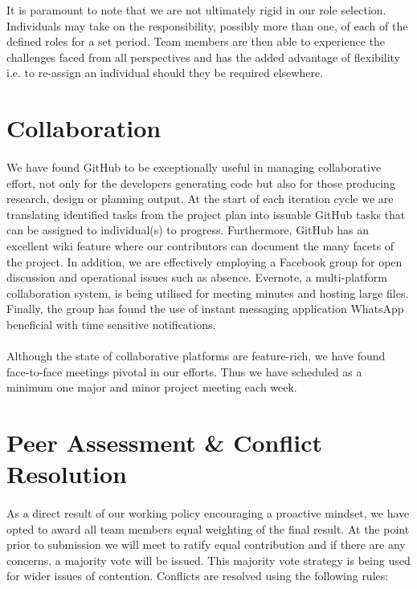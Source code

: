 \documentclass[11pt,a4paper]{article}
\begin{document}
It is paramount to note that we are not ultimately rigid in our role selection.  Individuals may take on the responsibility, possibly more than one, of each of the defined roles for a set period.  Team members are then able to experience the challenges faced from all perspectives and has the added advantage of flexibility i.e. to re-assign an individual should they be required elsewhere.

\section{Collaboration}
\paragraph{}
We have found GitHub to be exceptionally useful in managing collaborative effort, not only for the developers generating code but also for those producing research, design or planning output.  At the start of each iteration cycle we are translating identified tasks from the project plan into issuable GitHub tasks that can be assigned to individual(s) to progress.  Furthermore, GitHub has an excellent wiki feature where our contributors can document the many facets of the project.
\newline
In addition, we are effectively employing a Facebook group for open discussion and operational issues such as absence.  Evernote, a multi-platform collaboration system, is being utilised for meeting minutes and hosting large files.  Finally, the group has found the use of instant messaging application WhatsApp beneficial with time sensitive notifications.
\paragraph{}
Although the state of collaborative platforms are feature-rich, we have found face-to-face meetings pivotal in our efforts.  Thus we have scheduled as a minimum one major and minor project meeting each week.

\section{Peer Assessment \& Conflict Resolution}
\paragraph{}
As a direct result of our working policy encouraging a proactive mindset, we have opted to award all team members equal weighting of the final result.  At the point prior to submission we will meet to ratify equal contribution and if there are any concerns, a majority vote will be issued.
This majority vote strategy is being used for wider issues of contention.  Conflicts are resolved using the following rules:
\end{document}
